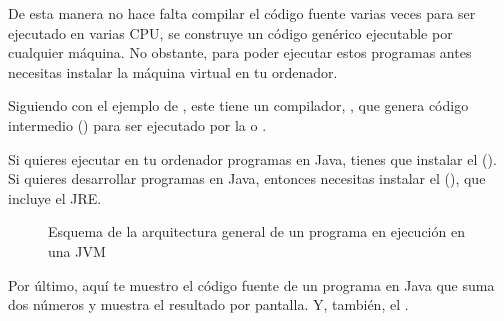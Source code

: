 \documentclass[letterpaper,10pt,spanish]{sphinxmanual}
\begin{document}
\sphinxAtStartPar
De esta manera no hace falta compilar el código fuente varias veces para ser ejecutado en varias CPU, se construye un código genérico ejecutable por cualquier máquina. No obstante, para poder ejecutar estos programas antes necesitas instalar la máquina virtual en tu ordenador.

\sphinxAtStartPar
Siguiendo con el ejemplo de , este tiene un compilador, , que genera código intermedio () para ser ejecutado por la  o .

\sphinxAtStartPar
Si quieres ejecutar en tu ordenador programas en Java, tienes que instalar el  (). Si quieres desarrollar programas en Java, entonces necesitas instalar el  (), que incluye el JRE.

\begin{figure}[htbp]
\centering
\capstart

\noindent{}
\caption{Esquema de la arquitectura general de un programa en ejecución en una JVM}\label{\detokenize{obtencion_del_codigo:id6}}\end{figure}

\sphinxAtStartPar
Por último, aquí te muestro el código fuente de un programa en Java que suma dos números y muestra el resultado por pantalla. Y, también, el .
\end{document}
